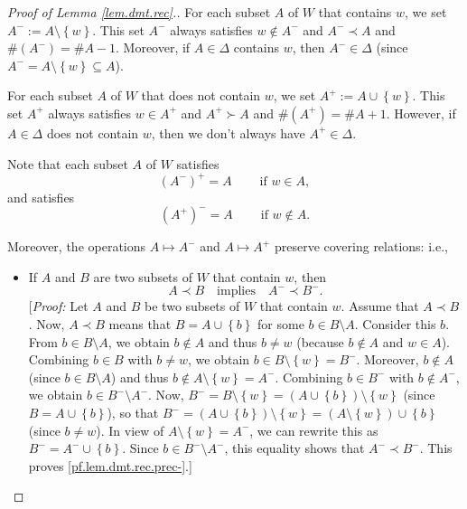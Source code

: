 \documentclass[12pt]{amsart}
\theoremstyle{definition}
\newcommand{\set}[1]{\left\{ #1 \right\}}
\newcommand{\tup}[1]{\left( #1 \right)}
\begin{document}
\begin{proof}[Proof of Lemma \ref{lem.dmt.rec}.]
For each subset $A$ of $W$ that contains $w$, we set $A^-:=A\setminus
\left\{  w\right\}  $. This set $A^-$ always satisfies $w\notin A^-$ and
$A^-\prec A$ and $\#\left(  A^-\right)  =\#A-1$. Moreover, if $A\in\Delta$
contains $w$, then $A^-\in\Delta$ (since $A^-=A\setminus\left\{
w\right\}  \subseteq A$).

For each subset $A$ of $W$ that does not contain $w$, we set $A^+%
:=A\cup\left\{  w\right\}  $. This set $A^+$ always satisfies $w\in A^+$
and $A^+\succ A$ and $\#\left(  A^+\right)  =\#A+1$. However, if
$A\in\Delta$ does not contain $w$, then we don't always have $A^+\in\Delta$.

Note that each subset $A$ of $W$ satisfies
\begin{equation}
\left(  A^-\right)  ^+=A\ \ \ \ \ \ \ \ \ \ \text{if }w\in A,
\label{pf.lem.dmt.rec.-+}%
\end{equation}
and satisfies%
\begin{equation}
\left(  A^+\right)  ^-=A\ \ \ \ \ \ \ \ \ \ \text{if }w\notin A.
\label{pf.lem.dmt.rec.+-}%
\end{equation}


Moreover, the operations $A\mapsto A^-$ and $A\mapsto A^+$ preserve
covering relations: i.e.,

\begin{itemize}
\item If $A$ and $B$ are two subsets of $W$ that contain $w$, then%
\begin{equation}
A\prec B \quad \text{implies} \quad A^-\prec B^-. \label{pf.lem.dmt.rec.prec-}%
\end{equation}
[\textit{Proof:} Let $A$ and $B$ be two subsets of $W$ that contain $w$.
Assume that $A \prec B$. Now, $A\prec B$ means that
$B = A \cup \set{b}$ for some $b\in B\setminus A$. Consider
this $b$. From $b \in B \setminus A$, we obtain $b \notin A$ and thus
$b \neq w$ (because $b \notin A$ and $w \in A$).
Combining $b \in B$ with $b \neq w$, we obtain
$b \in B \setminus \set{w} = B^-$. Moreover, $b \notin A$ (since
$b \in B \setminus A$) and thus $b \notin A \setminus \set{w} = A^-$.
Combining $b \in B^-$ with $b \notin A^-$, we obtain
$b \in B^- \setminus A^-$.
Now, $B^- = B \setminus \set{w} = \tup{A \cup \set{b}} \setminus \set{w}$
(since $B = A \cup \set{b}$), so that
$B^- = \tup{A \cup \set{b}} \setminus \set{w} = \tup{A \setminus \set{w}}
\cup \set{b}$ (since $b \neq w$). In view of $A \setminus \set{w} = A^-$,
we can rewrite this as $B^- = A^- \cup \set{b}$.
Since $b \in B^- \setminus A^-$, this equality shows that
$A^- \prec B^-$. This proves \eqref{pf.lem.dmt.rec.prec-}.] \\


\end{itemize}
\end{proof}
\end{document}
